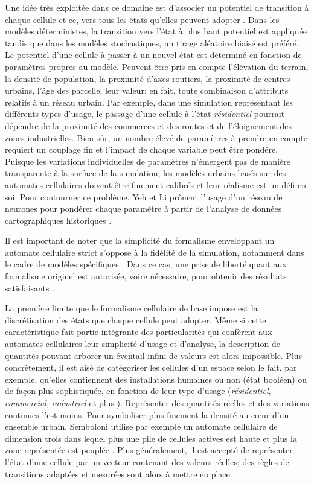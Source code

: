 \documentclass[12pt]{article}
\begin{document}
Une idée très exploitée dans ce domaine est d'associer un potentiel de
transition à chaque cellule et ce, vers tous les états qu'elles
peuvent adopter \cite{Benenson2004}. Dans les modèles déterministes,
la transition vers l'état à plus haut potentiel est appliquée tandis
que dans les modèles stochastiques, un tirage aléatoire biaisé est
préféré. Le potentiel d'une cellule à passer à un nouvel état est
déterminé en fonction de paramètres propres au modèle. Peuvent être
pris en compte l'élévation du terrain, la densité de population, la
proximité d'axes routiers, la proximité de centres urbains, l'âge des
parcelle, leur valeur; en fait, toute combinaison d'attributs relatifs
à un réseau urbain. Par exemple, dans une simulation représentant les
différents types d'usage, le passage d'une cellule à l'état
\textit{résidentiel} pourrait dépendre de la proximité des commerces
et des routes et de l'éloignement des zones industrielles. Bien sûr,
un nombre élevé de paramètres à prendre en compte requiert un couplage
fin et l'impact de chaque variable peut être pondéré. Puisque les
variations individuelles de paramètres n'émergent pas de manière
transparente à la surface de la simulation, les modèles urbains basés
sur des automates cellulaires doivent être finement calibrés et leur
réalisme est un défi en soi. Pour contourner ce problème, Yeh et Li
prônent l'usage d'un réseau de neurones pour pondérer chaque paramètre
à partir de l'analyse de données cartographiques historiques
\cite{Yeh2002}.

Il est important de noter que la simplicité du formalisme enveloppant
un automate cellulaire strict s'oppose à la fidélité de la simulation,
notamment dans le cadre de modèles spécifiques
\cite{Torrens2000,Torrens2001}. Dans ce cas, une prise de liberté
quant aux formalisme originel est autorisée, voire nécessaire, pour
obtenir des résultats satisfaisants \cite{White1998}.

La première limite que le formalisme cellulaire de base impose est la
discrétisation des états que chaque cellule peut adopter. Même si
cette caractéristique fait partie intégrante des particularités qui
confèrent aux automates cellulaires leur simplicité d'usage et
d'analyse, la description de quantités pouvant arborer un éventail
infini de valeurs est alors impossible. Plus concrètement, il est aisé
de catégoriser les cellules d'un espace selon le fait, par exemple,
qu'elles contiennent des installations humaines ou non (état booléen)
\cite{Benguigui2004,Cornu2008} ou de façon plus sophistiquée, en
fonction de leur type d'usage (\textit{résidentiel},
\textit{commercial}, \textit{industriel} \cite{Lechner} et plus
\cite{Dubos-Paillard2003}). Représenter des quantités réelles et des
variations continues l'est moins. Pour symboliser plus finement la
densité au c\oe ur d'un ensemble urbain, Semboloni utilise par exemple
un automate cellulaire de dimension trois dans lequel plus une pile de
cellules actives est haute et plus la zone représentée est peuplée
\cite{Semboloni2000}. Plus généralement, il est accepté de représenter
l'état d'une cellule par un vecteur contenant des valeurs réelles; des
règles de transitions adaptées et mesurées sont alors à mettre en
place.
\end{document}
